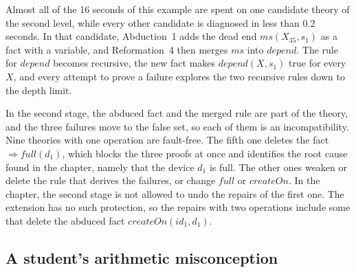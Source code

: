 \documentclass[preprint,12pt]{elsarticle}
\newcommand{\imp}{\Longrightarrow}
\begin{document}
Almost all of the 16 seconds of this example are spent on one candidate
theory of the second level, while every other candidate is diagnosed in
less than 0.2 seconds. In that candidate, Abduction~1
adds the dead end $\mathit{ms}(X_{35}, s_1)$ as a fact with a variable, and
Reformation~4 then merges $\mathit{ms}$ into $\mathit{depend}$. The rule
for $\mathit{depend}$ becomes recursive, the new fact makes
$\mathit{depend}(X, s_1)$ true for every $X$, and every attempt to prove a
failure explores the two recursive rules down to the depth limit.

In the second stage, the abduced fact and the merged rule are part of the
theory, and the three failures move to the false set, so each of them is
an incompatibility. Nine theories with one operation are fault-free. The
fifth one deletes the fact $\imp \mathit{full}(d_1)$, which blocks the three
proofs at once and identifies the root cause found in the chapter, namely
that the device $d_1$ is full. The other ones weaken or delete the rule
that derives the failures, or change $\mathit{full}$ or
$\mathit{createOn}$. In the chapter, the second stage is not allowed to
undo the repairs of the first one. The extension has no such protection,
so the repairs with two operations include some that delete the abduced
fact $\mathit{createOn}(\mathit{id}_1, d_1)$.

\subsection{A student's arithmetic misconception}
\label{sec:arith}
\end{document}
